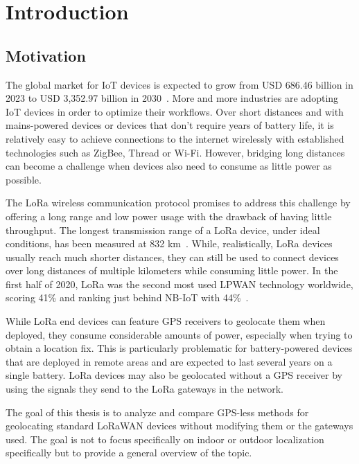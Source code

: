 \chapter{Introduction}

\section{Motivation}

The global market for \ac{IoT} devices is expected to grow from USD 686.46 billion in 2023 to USD 3,352.97 billion in 2030~\cite{statista_industrial_2023}.
More and more industries are adopting \ac{IoT} devices in order to optimize their workflows.
Over short distances and with mains-powered devices or devices that don't require years of battery life, it is relatively easy to achieve connections to the internet wirelessly with established technologies such as ZigBee, Thread or Wi-Fi.
However, bridging long distances can become a challenge when devices also need to consume as little power as possible.

The \ac{LoRa} wireless communication protocol promises to address this challenge by offering a long range and low power usage with the drawback of having little throughput.
The longest transmission range of a \ac{LoRa} device, under ideal conditions, has been measured at 832 km~\cite{the_things_network_global_team_lora_nodate}.
While, realistically, \ac{LoRa} devices usually reach much shorter distances, they can still be used to connect devices over long distances of multiple kilometers while consuming little power.
In the first half of 2020, \ac{LoRa} was the second most used \ac{LPWAN} technology worldwide, scoring 41\% and ranking just behind NB-IoT with 44\%~\cite{iot_analytics_lpwa_2020}.

While \ac{LoRa} end devices can feature \ac{GPS} receivers to geolocate them when deployed, they consume considerable amounts of power, especially when trying to obtain a location fix.
This is particularly problematic for battery-powered devices that are deployed in remote areas and are expected to last several years on a single battery.
\ac{LoRa} devices may also be geolocated without a \ac{GPS} receiver by using the signals they send to the \ac{LoRa} gateways in the network.

The goal of this thesis is to analyze and compare \ac{GPS}-less methods for geolocating standard \ac{LoRaWAN} devices without modifying them or the gateways used.
The goal is not to focus specifically on indoor or outdoor localization specifically but to provide a general overview of the topic.

